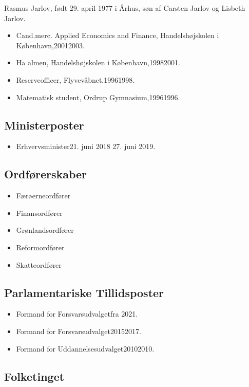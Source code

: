 \documentclass[11pt, a4paper]{awesome-cv}
\begin{document}
\makecvheader[R]
\makelettertitle
\begin{cvletter}
Rasmus Jarlov, født 29. april 1977 i Århus, søn af Carsten Jarlov og Lisbeth Jarlov.

\begin{itemize}
\item Cand.merc. Applied Economics and Finance, Handelshøjskolen i København,20012003.
\item Ha almen, Handelshøjskolen i København,19982001.
\item Reserveofficer, Flyvevåbnet,19961998.
\item Matematisk student, Ordrup Gymnasium,19961996.
\end{itemize}
\subsection*{Ministerposter}
\begin{itemize}
\item Erhvervsminister21. juni 2018  27. juni 2019.
\end{itemize}
\subsection*{Ordførerskaber}
\begin{itemize}
\item Færøerneordfører
\item Finansordfører
\item Grønlandsordfører
\item Reformordfører
\item Skatteordfører
\end{itemize}
\subsection*{Parlamentariske Tillidsposter}
\begin{itemize}
\item Formand for Forsvarsudvalgetfra 2021.
\item Formand for Forsvarsudvalget20152017.
\item Formand for Uddannelsesudvalget20102010.
\end{itemize}
\subsection*{Folketinget}

\end{cvletter}
\end{document}
